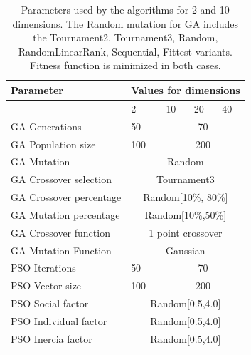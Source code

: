 \documentclass[runningheads]{llncs}
\begin{document}
   \begin{table}[h!tp]
    \caption{Parameters used by the algorithms for 2 and 10 dimensions. The Random mutation for GA includes the Tournament2, Tournament3, Random, RandomLinearRank, Sequential, Fittest variants. Fitness function is minimized in both cases.}
    \label{table:ga-pso-parameters}
    \centering
    \begin{tabularx}{\linewidth}{|l|X|X|X|X|}
    \hline
    Parameter & \multicolumn{4}{c|}{Values for dimensions} \\
      \hline
      & 2 & 10 & 20 & 40 \\
    \hline
    GA Generations & 50 &  \multicolumn{3}{c|}{70} \\
    \hline
     GA Population size & 100 &  \multicolumn{3}{c|}{200}\\
    \hline
    GA Mutation &  \multicolumn{4}{c|}{Random}\\
    \hline
    GA Crossover selection & \multicolumn{4}{c|}{Tournament3} \\
    \hline
    GA Crossover percentage & \multicolumn{4}{c|}{Random[10\%, 80\%]} \\
    \hline
    GA Mutation percentage & \multicolumn{4}{c|}{Random[10\%,50\%]} \\
    \hline
    GA Crossover function & \multicolumn{4}{c|}{1 point crossover} \\
    \hline
    GA Mutation Function & \multicolumn{4}{c|}{Gaussian} \\
      \hline 
      \hline
    PSO Iterations & 50 & \multicolumn{3}{c|}{70} \\
    \hline
    PSO Vector size & 100 & \multicolumn{3}{c|}{200} \\
    \hline
    PSO Social factor & \multicolumn{4}{c|}{Random[0.5,4.0]} \\
    \hline
    PSO Individual factor & \multicolumn{4}{c|}{Random[0.5,4.0]} \\
    \hline
    PSO Inercia factor & \multicolumn{4}{c|}{Random[0.5,4.0]} \\
    \hline
    \end{tabularx}
    \end{table}


  
\end{document}
